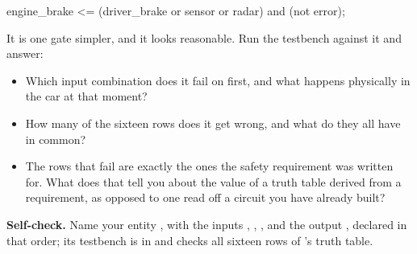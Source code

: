 \begin{vhdlcode}
engine_brake <= (driver_brake or sensor or radar) and (not error);
\end{vhdlcode}

It is one gate simpler, and it looks reasonable. Run the testbench against it and answer:
\begin{itemize}
  \item Which input combination does it fail on first, and what happens physically in the car at
    that moment?
  \item How many of the sixteen rows does it get wrong, and what do they all have in common?
  \item The rows that fail are exactly the ones the safety requirement was written for. What does
    that tell you about the value of a truth table derived from a requirement, as opposed to one
    read off a circuit you have already built?
\end{itemize}


\begin{selfcheck}
\textbf{Self-check.} Name your entity , with the inputs ,
, ,  and the output , declared in that
order; its testbench is in  and checks all sixteen rows of
's truth table.
\end{selfcheck}
